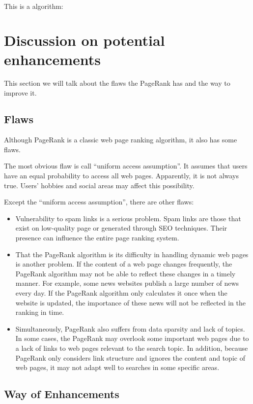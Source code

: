 \documentclass[lettersize,journal,12pt,conference]{IEEEtran}
\begin{document}
This is a algorithm:




\section{Discussion on potential enhancements}

This section we will talk about the flaws the PageRank has and the way to improve it.
\subsection{Flaws}

Although PageRank is a classic web page ranking algorithm, it also has some flaws.

The most obvious flaw is call ``uniform access assumption''. It assumes that users have an equal probability to access all web pages. Apparently, it is not always true. Users' hobbies and social areas may affect this possibility.

Except the ``uniform access assumption'', there are other flaws:
\begin{itemize}
	\item Vulnerability to spam links is a serious problem. Spam links are those that exist on low-quality page or generated through SEO techniques. Their presence can influence the entire page ranking system.
	\item That the PageRank algorithm is its difficulty in handling dynamic web pages is another problem. If the content of a web page changes frequently, the PageRank algorithm may not be able to reflect these changes in a timely manner. For example, some news websites publish a large number of news every day. If the PageRank algorithm only calculates it once when the website is updated, the importance of these news will not be reflected in the ranking in time.
	\item Simultaneously, PageRank also suffers from data sparsity and lack of topics. In some cases, the PageRank may overlook some important web pages due to a lack of links to web pages relevant to the search topic. In addition, because PageRank only considers link structure and ignores the content and topic of web pages, it may not adapt well to searches in some specific areas.
\end{itemize}

\subsection{Way of Enhancements}
\end{document}
